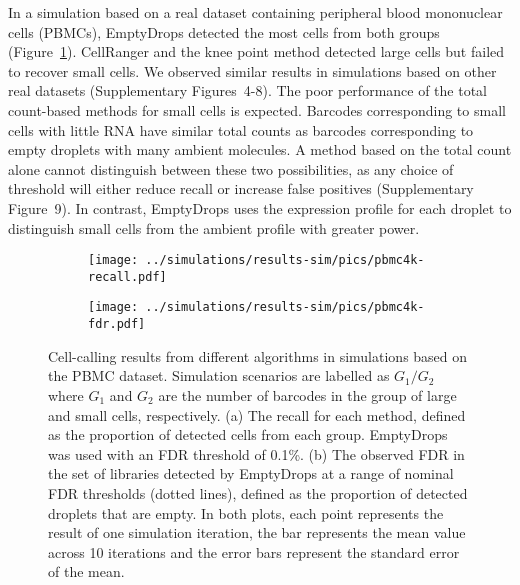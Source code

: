 \documentclass[10pt,letterpaper]{article}
\newcommand{\suppfigsimresults}{4-8}
\newcommand{\suppfigsimrocs}{9}
\begin{document}
In a simulation based on a real dataset containing peripheral blood mononuclear cells (PBMCs), EmptyDrops detected the most cells from both groups (Figure~\ref{fig:simpbmc}).
CellRanger and the knee point method detected large cells but failed to recover small cells.
We observed similar results in simulations based on other real datasets (Supplementary Figures~\suppfigsimresults{}).
The poor performance of the total count-based methods for small cells is expected.
Barcodes corresponding to small cells with little RNA have similar total counts as barcodes corresponding to empty droplets with many ambient molecules.
A method based on the total count alone cannot distinguish between these two possibilities, 
as any choice of threshold will either reduce recall or increase false positives (Supplementary Figure~\suppfigsimrocs{}).
In contrast, EmptyDrops uses the expression profile for each droplet to distinguish small cells from the ambient profile with greater power.

\begin{figure}[btp]
    \begin{center}
        \begin{subfigure}{\textwidth}
        \texttt{[image: ../simulations/results-sim/pics/pbmc4k-recall.pdf]}
        \caption{}
        \end{subfigure}
        \begin{subfigure}{\textwidth}
        \texttt{[image: ../simulations/results-sim/pics/pbmc4k-fdr.pdf]}
        \caption{}
        \end{subfigure}
    \end{center}
\caption{Cell-calling results from different algorithms in simulations based on the PBMC dataset.
Simulation scenarios are labelled as $G_1/G_2$ where $G_1$ and $G_2$ are the number of barcodes in the group of large and small cells, respectively.
(a) The recall for each method, defined as the proportion of detected cells from each group.
EmptyDrops was used with an FDR threshold of 0.1\%.
(b) The observed FDR in the set of libraries detected by EmptyDrops at a range of nominal FDR thresholds (dotted lines), defined as the proportion of detected droplets that are empty.
In both plots, each point represents the result of one simulation iteration, the bar represents the mean value across 10 iterations and the error bars represent the standard error of the mean.
}
\label{fig:simpbmc}
\end{figure}
\end{document}
